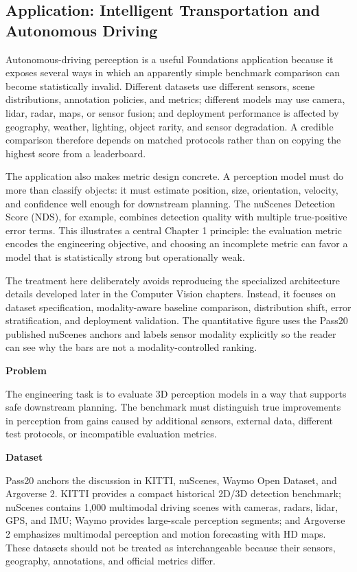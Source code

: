 \subsection{Application: Intelligent Transportation and Autonomous Driving}

Autonomous-driving perception is a useful Foundations application because it exposes several ways in which an apparently simple benchmark comparison can become statistically invalid. Different datasets use different sensors, scene distributions, annotation policies, and metrics; different models may use camera, lidar, radar, maps, or sensor fusion; and deployment performance is affected by geography, weather, lighting, object rarity, and sensor degradation. A credible comparison therefore depends on matched protocols rather than on copying the highest score from a leaderboard.

The application also makes metric design concrete. A perception model must do more than classify objects: it must estimate position, size, orientation, velocity, and confidence well enough for downstream planning. The nuScenes Detection Score (NDS), for example, combines detection quality with multiple true-positive error terms. This illustrates a central Chapter 1 principle: the evaluation metric encodes the engineering objective, and choosing an incomplete metric can favor a model that is statistically strong but operationally weak.

The treatment here deliberately avoids reproducing the specialized architecture details developed later in the Computer Vision chapters. Instead, it focuses on dataset specification, modality-aware baseline comparison, distribution shift, error stratification, and deployment validation. The quantitative figure uses the Pass20 published nuScenes anchors and labels sensor modality explicitly so the reader can see why the bars are not a modality-controlled ranking.

\textbf{Problem}

The engineering task is to evaluate 3D perception models in a way that supports safe downstream planning. The benchmark must distinguish true improvements in perception from gains caused by additional sensors, external data, different test protocols, or incompatible evaluation metrics.

\textbf{Dataset}

Pass20 anchors the discussion in KITTI, nuScenes, Waymo Open Dataset, and Argoverse 2. KITTI provides a compact historical 2D/3D detection benchmark; nuScenes contains 1,000 multimodal driving scenes with cameras, radars, lidar, GPS, and IMU; Waymo provides large-scale perception segments; and Argoverse 2 emphasizes multimodal perception and motion forecasting with HD maps. These datasets should not be treated as interchangeable because their sensors, geography, annotations, and official metrics differ.

